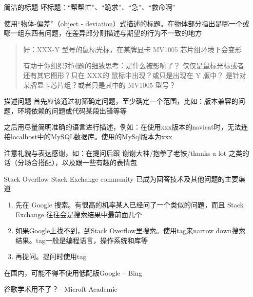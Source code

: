\documentclass[10pt]{beamer}
\begin{document}
\begin{frame}[fragile]{简洁的标题}
    坏标题：“帮帮忙”、“跪求”、“急”、“救命啊”

    使用“物体-偏差”（object - deviation）式描述的标题。在物体部分指出是哪一个或哪一组东西有问题，在差异部分则描述与期望的行为不一致的地方

    \begin{quote}
        好：XXX-Y 型号的鼠标光标，在某牌显卡 MV1005 芯片组环境下会变形

        有助于你组织对问题的细致思考：是什么被影响了？ 仅仅是鼠标光标或者还有其它图形？只在 XXX的 鼠标中出现？或只是出现在 Y 版中？ 是针对某牌显卡芯片组？或者只是其中的 MV1005 型号？
    \end{quote}

\end{frame}

\begin{frame}[fragile]{描述问题}
    首先应该通过初筛确定问题，至少确定一个范围，比如：版本兼容的问题，环境依赖的问题或代码某段出错等等

    之后用尽量简明准确的语言进行描述，例如：在使用xxx版本的navicat时，无法连接localhost中的MySQL数据库。使用的MySql版本为xxx

    注意礼貌与表达感谢，如：在提问后跟  谢谢大神/抱拳了老铁/thanks a lot 之类的话（分场合搭配），以及跟一些有趣的表情包
\end{frame}

\begin{frame}[fragile]{Stack Overflow}
    Stack Exchange community 已成为回答技术及其他问题的主要渠道

    \begin{enumerate}
        \item 先在 Google 搜索。有很高的机率某人已经问了一个类似的问题，而且 Stack Exchange 往往会是搜索结果中最前面几个
        \item 如果Google上找不到，到Stack Overflow里搜索。使用tag来narrow down搜索结果。tag一般是编程语言，操作系统和库等
        \item 再提问。提问时使用tag
    \end{enumerate}

    在国内，可能不得不使用低配版Google -- Bing

    谷歌学术用不了？-- Microft Academic
\end{frame}
\end{document}
